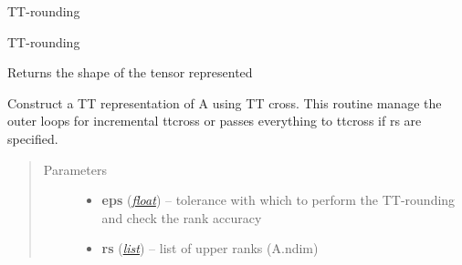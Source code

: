 \documentclass[a4paper,10pt,english]{sphinxmanual}
\begin{document}
\begin{fulllineitems}
\begin{fulllineitems}
\end{fulllineitems}


\begin{fulllineitems}
\label{api-ttvec:TensorToolbox.core.TTvec.rounding}
TT-rounding

\end{fulllineitems}


\begin{fulllineitems}
\label{api-ttvec:TensorToolbox.core.TTvec.rounding2}
TT-rounding

\end{fulllineitems}


\begin{fulllineitems}
\label{api-ttvec:TensorToolbox.core.TTvec.shape}
Returns the shape of the tensor represented

\end{fulllineitems}


\begin{fulllineitems}
\label{api-ttvec:TensorToolbox.core.TTvec.ttcross}
Construct a TT representation of A using TT cross. This routine manage the outer loops for incremental ttcross or passes everything to ttcross if rs are specified.
\begin{quote}\begin{description}
\item[{Parameters}] \leavevmode\begin{itemize}
\item {} 
\textbf{eps} (\href{http://docs.python.org/library/functions.html\#float}{\emph{float}}) -- tolerance with which to perform the TT-rounding and check the rank accuracy

\item {} 
\textbf{rs} (\href{http://docs.python.org/library/functions.html\#list}{\emph{list}}) -- list of upper ranks (A.ndim)


\end{itemize}
\end{description}
\end{quote}
\end{fulllineitems}
\end{fulllineitems}
\end{document}
